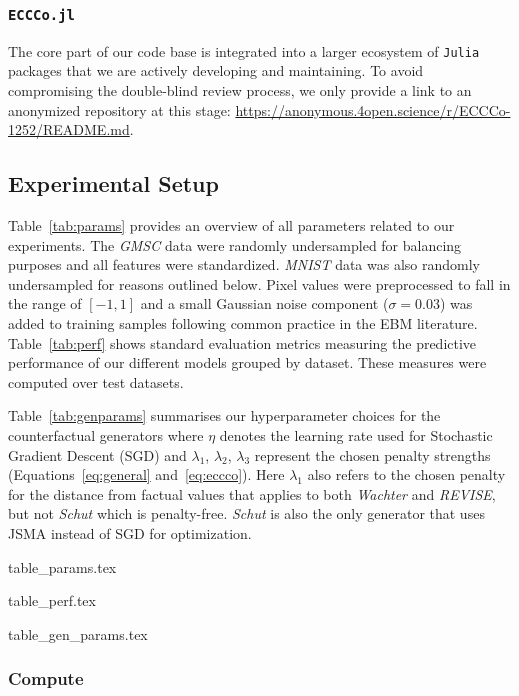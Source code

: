 \documentclass{article}
\begin{document}
\subsubsection{\texttt{ECCCo.jl}}

The core part of our code base is integrated into a larger ecosystem of \texttt{Julia} packages that we are actively developing and maintaining. To avoid compromising the double-blind review process, we only provide a link to an anonymized repository at this stage: \url{https://anonymous.4open.science/r/ECCCo-1252/README.md}. 

\subsection{Experimental Setup}\label{app:setup}

Table~\ref{tab:params} provides an overview of all parameters related to our experiments. The \textit{GMSC} data were randomly undersampled for balancing purposes and all features were standardized. \textit{MNIST} data was also randomly undersampled for reasons outlined below. Pixel values were preprocessed to fall in the range of $[-1,1]$ and a small Gaussian noise component ($\sigma=0.03$) was added to training samples following common practice in the EBM literature. Table~\ref{tab:perf} shows standard evaluation metrics measuring the predictive performance of our different models grouped by dataset. These measures were computed over test datasets. 

Table~\ref{tab:genparams} summarises our hyperparameter choices for the counterfactual generators where $\eta$ denotes the learning rate used for Stochastic Gradient Descent (SGD) and $\lambda_1$, $\lambda_2$, $\lambda_3$ represent the chosen penalty strengths (Equations~\ref{eq:general} and~\ref{eq:eccco}). Here $\lambda_1$ also refers to the chosen penalty for the distance from factual values that applies to both \textit{Wachter} and \textit{REVISE}, but not \textit{Schut} which is penalty-free. \textit{Schut} is also the only generator that uses JSMA instead of SGD for optimization.

{table_params.tex}

{table_perf.tex}

{table_gen_params.tex}

\subsubsection{Compute}
\end{document}
